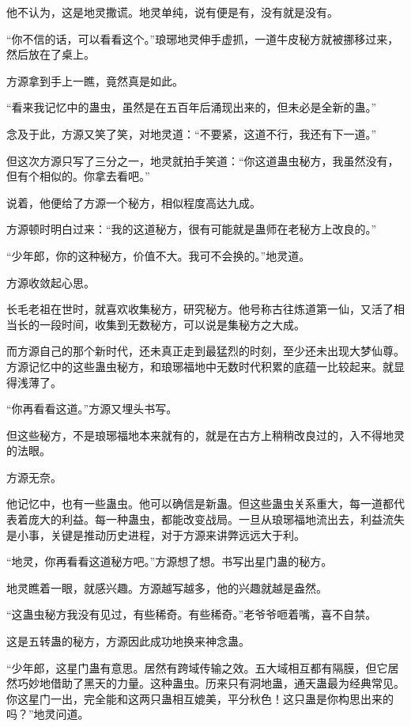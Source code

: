 \begin{this_body}
他不认为，这是地灵撒谎。地灵单纯，说有便是有，没有就是没有。

“你不信的话，可以看看这个。”琅琊地灵伸手虚抓，一道牛皮秘方就被挪移过来，然后放在了桌上。

方源拿到手上一瞧，竟然真是如此。

“看来我记忆中的蛊虫，虽然是在五百年后涌现出来的，但未必是全新的蛊。”

念及于此，方源又笑了笑，对地灵道：“不要紧，这道不行，我还有下一道。”

但这次方源只写了三分之一，地灵就拍手笑道：“你这道蛊虫秘方，我虽然没有，但有个相似的。你拿去看吧。”

说着，他便给了方源一个秘方，相似程度高达九成。

方源顿时明白过来：“我的这道秘方，很有可能就是蛊师在老秘方上改良的。”

“少年郎，你的这种秘方，价值不大。我可不会换的。”地灵道。

方源收敛起心思。

长毛老祖在世时，就喜欢收集秘方，研究秘方。他号称古往炼道第一仙，又活了相当长的一段时间，收集到无数秘方，可以说是集秘方之大成。

而方源自己的那个新时代，还未真正走到最猛烈的时刻，至少还未出现大梦仙尊。方源记忆中的这些蛊虫秘方，和琅琊福地中无数时代积累的底蕴一比较起来。就显得浅薄了。

“你再看看这道。”方源又埋头书写。

但这些秘方，不是琅琊福地本来就有的，就是在古方上稍稍改良过的，入不得地灵的法眼。

方源无奈。

他记忆中，也有一些蛊虫。他可以确信是新蛊。但这些蛊虫关系重大，每一道都代表着庞大的利益。每一种蛊虫，都能改变战局。一旦从琅琊福地流出去，利益流失是小事，关键是推动历史进程，对于方源来讲弊远远大于利。

“地灵，你再看看这道秘方吧。”方源想了想。书写出星门蛊的秘方。

地灵瞧着一眼，就感兴趣。方源越写越多，他的兴趣就越是盎然。

“这蛊虫秘方我没有见过，有些稀奇。有些稀奇。”老爷爷咂着嘴，喜不自禁。

这是五转蛊的秘方，方源因此成功地换来神念蛊。

“少年郎，这星门蛊有意思。居然有跨域传输之效。五大域相互都有隔膜，但它居然巧妙地借助了黑天的力量。这种蛊虫。历来只有洞地蛊，通天蛊最为经典常见。你这星门一出，完全能和这两只蛊相互媲美，平分秋色！这只蛊是你构思出来的吗？”地灵问道。


\end{this_body}
